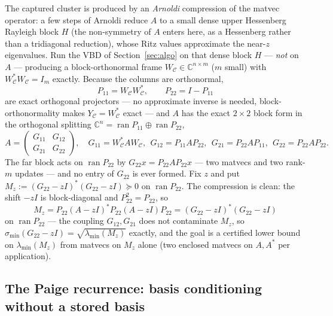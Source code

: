 \documentclass[11pt,a4paper]{article}
\newcommand{\C}{\mathbb{C}}
\theoremstyle{plain}
\theoremstyle{definition}
\begin{document}
The captured cluster is produced by an \emph{Arnoldi} compression of the matvec operator: a
few steps of Arnoldi reduce $A$ to a small dense upper Hessenberg Rayleigh block $H$ (the
non-symmetry of $A$ enters here, as a Hessenberg rather than a tridiagonal reduction), whose
Ritz values approximate the near-$z$ eigenvalues. Run the VBD of Section~\ref{sec:algo} on
that dense block $H$ --- \emph{not} on $A$ --- producing a
block-orthonormal frame $W_{\mathcal C}\in\C^{n\times m}$ ($m$ small) with
$W_{\mathcal C}^{*}W_{\mathcal C}=I_m$ exactly. Because the columns are orthonormal,
\[
  P_{11}=W_{\mathcal C}W_{\mathcal C}^{*},\qquad P_{22}=I-P_{11}
\]
are exact orthogonal projectors --- no approximate inverse is needed, block-orthonormality
makes $Y_{\mathcal C}=W_{\mathcal C}^{*}$ exact --- and $A$ has the exact $2\times2$ block
form in the orthogonal splitting $\C^{n}=\operatorname{ran}P_{11}\oplus\operatorname{ran}P_{22}$,
\[
  A=\begin{pmatrix}G_{11}&G_{12}\\G_{21}&G_{22}\end{pmatrix},\quad
  G_{11}=W_{\mathcal C}^{*}AW_{\mathcal C},\ \ G_{12}=P_{11}AP_{22},\ \
  G_{21}=P_{22}AP_{11},\ \ G_{22}=P_{22}AP_{22}.
\]
The far block acts on $\operatorname{ran}P_{22}$ by $G_{22}x=P_{22}AP_{22}x$ --- two
matvecs and two rank-$m$ updates --- and no entry of $G_{22}$ is ever formed. Fix $z$ and
put $M_z:=(G_{22}-zI)^{*}(G_{22}-zI)\succeq0$ on $\operatorname{ran}P_{22}$. The
compression is clean: the shift $-zI$ is block-diagonal and $P_{22}^2=P_{22}$, so
\[
  M_z=P_{22}(A-zI)^{*}P_{22}(A-zI)P_{22}=(G_{22}-zI)^{*}(G_{22}-zI)
\]
on $\operatorname{ran}P_{22}$ --- the coupling $G_{12},G_{21}$ does not contaminate $M_z$,
so $\sigma_{\min}(G_{22}-zI)=\sqrt{\lambda_{\min}(M_z)}$ exactly, and the goal is a
certified lower bound on $\lambda_{\min}(M_z)$ from matvecs on $M_z$ alone (two enclosed
matvecs on $A,A^{*}$ per application).

\subsection*{The Paige recurrence: basis conditioning without a stored basis}
\end{document}
